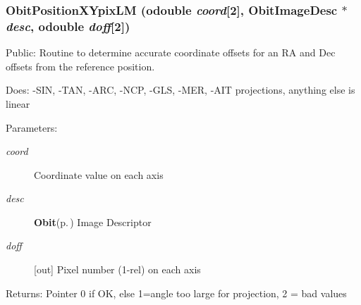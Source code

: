 \subsubsection{ Obit\-Position\-XYpix\-LM ({\bf odouble} {\em coord}[2], {\bf Obit\-Image\-Desc} $\ast$ {\em desc}, {\bf odouble} {\em doff}[2])}\label{ObitPosition_8h_a3}


Public: Routine to determine accurate coordinate offsets for an RA and Dec offsets from the reference position. 

Does: -SIN, -TAN, -ARC, -NCP, -GLS, -MER, -AIT projections, anything else is linear

\begin{Desc}
\item[Parameters:]
\begin{description}
\item[{\em coord}]Coordinate value on each axis \item[{\em desc}]{\bf Obit}{\rm (p.\,\pageref{structObit})} Image Descriptor \item[{\em doff}][out] Pixel number (1-rel) on each axis \end{description}
\end{Desc}
\begin{Desc}
\item[Returns:]Pointer 0 if OK, else 1=angle too large for projection, 2 = bad values \end{Desc}
